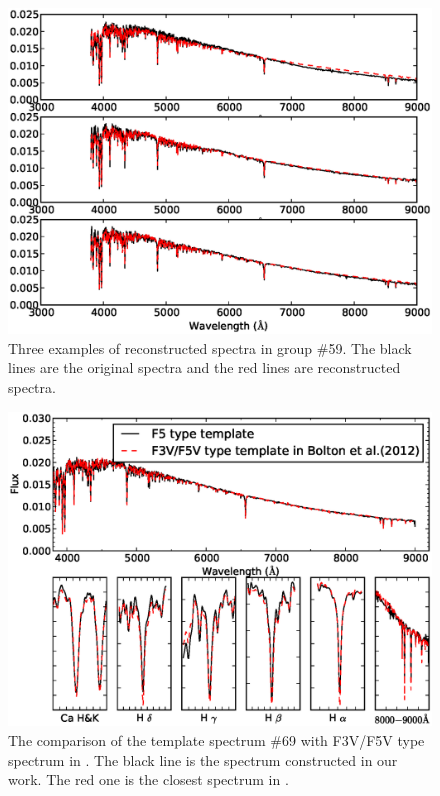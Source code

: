 \documentclass[manuscript]{aastex}
\begin{document}
 \begin{figure}
   \centering
   \includegraphics[width=14cm, angle=0,clip]{f81.eps}
   \caption{Three examples of reconstructed spectra in group \#59.
The black lines are the original spectra and the red lines are reconstructed spectra.
   }
   \label{Fig81}
\end{figure}
\begin{figure}
   \centering
   \includegraphics[width=14cm, angle=0,clip]{f91.eps}
   \caption{The comparison of the template spectrum \#69 with  F3V/F5V type spectrum  in  \citet{bolton2012spectral}.
The black line is the spectrum constructed in our work.
The red one is the closest spectrum in  \citet{bolton2012spectral}.
   }
   \label{Fig91}
\end{figure}
\end{document}
